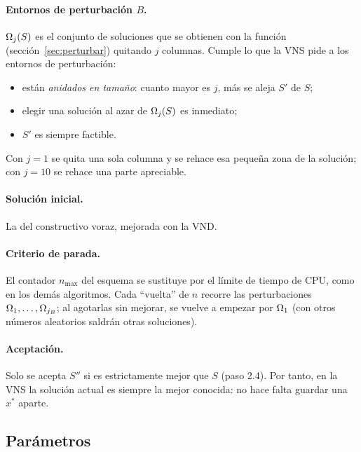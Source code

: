 \paragraph{Entornos de perturbación $B$.}

\begin{decision}[Decisión: $\Om{j}$ = quitar $j$ columnas al azar y reparar]
$\Omega_{j}(S)$ es el conjunto de soluciones que se obtienen con la función 
(sección~\ref{sec:perturbar}) quitando $j$ columnas. Cumple lo que la VNS pide a los entornos
de perturbación:
\begin{itemize}[itemsep=0pt]
  \item están \emph{anidados en tamaño}: cuanto mayor es $j$, más se aleja $S'$ de $S$;
  \item elegir una solución al azar de $\Omega_{j}(S)$ es inmediato;
  \item $S'$ es siempre factible.
\end{itemize}
Con $j=1$ se quita una sola columna y se rehace esa pequeña zona de la solución; con $j=10$
se rehace una parte apreciable.
\end{decision}

\paragraph{Solución inicial.} La del constructivo voraz, mejorada con la VND.

\paragraph{Criterio de parada.} El contador $n_{\max}$ del esquema se sustituye por el límite
de tiempo de CPU, como en los demás algoritmos. Cada ``vuelta'' de $n$ recorre las
perturbaciones $\Omega_{1},\dots,\Omega_{j_B}$; al agotarlas sin mejorar, se vuelve a empezar por
$\Omega_{1}$ (con otros números aleatorios saldrán otras soluciones).

\paragraph{Aceptación.} Solo se acepta $S''$ si es estrictamente mejor que $S$ (paso 2.4).
Por tanto, en la VNS la solución actual es siempre la mejor conocida: no hace falta guardar
una $x^\ast$ aparte.

\subsection{Parámetros}

